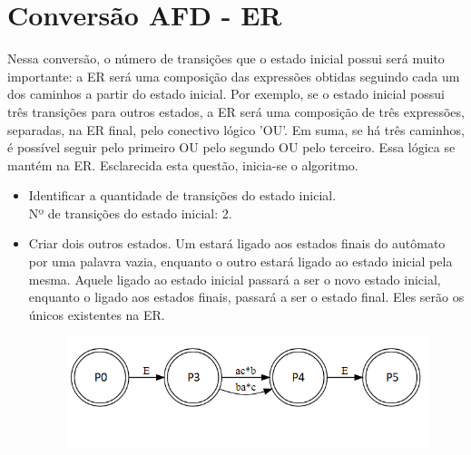 \documentclass[a4paper,10pt]{article} %
\begin{document}
\section{Conversão AFD - ER}
    Nessa conversão, o número de transições que o estado inicial possui será muito importante: a ER será uma composição das expressões obtidas seguindo cada um dos caminhos a partir do estado inicial. Por exemplo, se o estado inicial possui três transições para outros estados, a ER será uma composição de três expressões, separadas, na ER final, pelo conectivo lógico 'OU'. Em suma, se há três caminhos, é possível seguir pelo primeiro OU pelo segundo OU pelo terceiro. Essa lógica se mantém na ER. Esclarecida esta questão, inicia-se o algoritmo.
    \begin{itemize}
        \item Identificar a quantidade de transições do estado inicial.\\Nº de transições do estado inicial: 2.
        \item Criar dois outros estados. Um estará ligado aos estados finais do autômato por uma palavra vazia, enquanto o outro estará ligado ao estado inicial pela mesma. Aquele ligado ao estado inicial passará a ser o novo estado inicial, enquanto o ligado aos estados finais, passará a ser o estado final. Eles serão os únicos existentes na ER.
            \begin{center}
                \begin{figure}[!htb]
                    \includegraphics[scale = 1]{Figura_ex15.png}

\end{figure}
\end{center}
\end{itemize}
\end{document}
